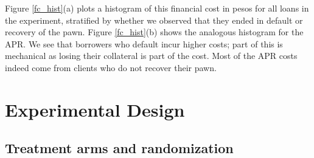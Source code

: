 \documentclass[ecta,nameyear,final]{econsocart}
\begin{document}
Figure \ref{fc_hist}(a) plots a histogram of this financial cost in pesos for all loans in the experiment, stratified by whether we observed that they ended in default or recovery of the pawn. Figure \ref{fc_hist}(b) shows the analogous histogram for the APR.
We see that borrowers who default incur higher costs; part of this is mechanical as losing their collateral is part of the cost. Most of the APR costs indeed come from clients who do not recover their pawn.
 





\section{Experimental Design} \label{Design}

\subsection{Treatment arms and randomization}
\end{document}
